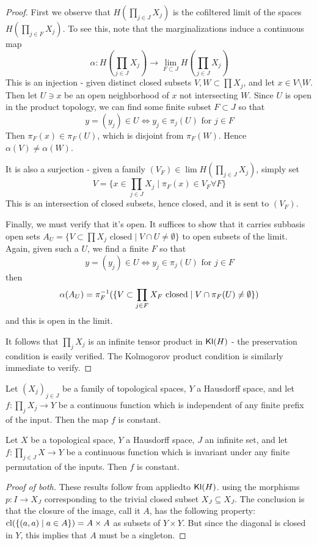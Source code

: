 \documentclass[11pt]{article}
\begin{document}
\begin{proof}
    First we observe that $H(\prod_{j\in J} X_j)$ is the cofiltered limit of the spaces
    $H(\prod_{j\in F} X_j)$.
    To see this, note that the marginalizations induce a continuous map
    \[\alpha: H(\prod_{j\in J} X_j) \to \lim_{F \subset J} H(\prod_{j \in J} X_j)\]
    This is an injection - given distinct closed subsets $V, W \subset \prod X_j$, and let $x \in V \setminus W$.
    Then let $U \ni x$ be an open neighborhood of $x$ not intersecting $W$.
    Since $U$ is open in the product topology, we can find some finite subset $F \subset J$ so that 
    \[y = (y_j) \in U \Leftrightarrow y_j \in \pi_j(U) \text{ for $j\in F$}\]
    Then $\pi_F(x) \in \pi_F(U)$, which is disjoint from $\pi_F(W)$. Hence $\alpha(V) \neq \alpha(W)$.

    It is also a surjection - given a family $(V_F) \in \lim H(\prod_{j \in J} X_j)$, simply set
    \[V = \{x \in \prod_{j\in J} X_j \mid  \pi_F(x) \in V_F \forall F\}\]
    This is an intersection of closed subsets, hence closed, and it is sent to $(V_F)$.

    Finally, we must verify that it's open.
    It suffices to show that it carries subbasis open sets $A_U = \{V \subset \prod X_j \text{ closed} \mid V \cap U \neq \emptyset\}$ to open subsets of the limit.
    Again, given such a $U$, we find a finite $F$ so that
    \[y = (y_j) \in U \Leftrightarrow y_j \in \pi_j(U) \text{ for $j\in F$}\]
    then \[\alpha(A_U) = \pi_F^{-1}(\{V \subset \prod_{j \in F} X_F \text{ closed} \mid V \cap \pi_F(U) \neq \emptyset\})\]
    and this is open in the limit.

    It follows that $\prod_j X_j$ is an infinite tensor product in $\operatorname{\mathsf{Kl}}(H)$ - the preservation condition is easily verified.
    The Kolmogorov product condition is similarly immediate to verify.
\end{proof}
\begin{corollary}
    Let $(X_j)_{j \in J}$ be a family of topological spaces, $Y$ a Hausdorff space, and let $f: \prod_j X_j \to Y$ be a continuous function
    which is independent of any finite prefix of the input.
    Then the map $f$ is constant.
\end{corollary}
\begin{corollary}
	Let $X$ be a topological space, $Y$ a Hausdorff space, $J$ an infinite set, and let $f: \prod_{j\in J} X \to Y$ be a continuous function which is invariant under any finite permutation of the inputs.
    Then $f$ is constant.
\end{corollary}
\begin{proof}[Proof of both]
	These results follow from  appliedto $\operatorname{\mathsf{Kl}}(H)$.
	using the morphisms $p : I \to X_J$ corresponding to the trivial closed subset $X_J \subseteq X_J$.
    The conclusion is that the closure of the image, call it $A$, has the following property: $\operatorname{cl}(\{(a,a) \mid a \in A\}) = A \times A$ as subsets of $Y \times Y$.
    But since the diagonal is closed in $Y$, this implies that $A$ must be a singleton.
\end{proof}




\end{document}
